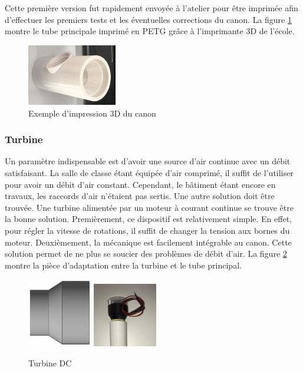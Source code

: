 Cette première version fut rapidement envoyée à l’atelier pour être imprimée afin d’effectuer 
les premiers tests et les éventuelles corrections du canon. La figure \ref{fig:3DPrintCanon} montre 
le tube principale imprimé en PETG grâce à l’imprimante 3D de l’école.

\begin{figure}[H]
    \centering
    \includegraphics[width=0.35\textwidth]{Images/photos_PGA/CanonBloc.jpg}
    \caption{Exemple d'impression 3D du canon}
    \label{fig:3DPrintCanon}
\end{figure}

\subsubsection{Turbine}

Un paramètre indispensable est d’avoir une source d’air continue avec un débit satisfaisant. La salle de classe étant 
équipée d’air comprimé, il suffit de l’utiliser pour avoir un débit d’air constant. Cependant, 
le bâtiment étant encore en travaux, les raccords d’air n’étaient pas sertis. Une autre solution doit 
être trouvée. Une turbine alimentée par un moteur à courant continue se trouve être la bonne 
solution. Premièrement, ce dispositif est relativement simple. En effet, pour régler la vitesse de rotations, il suffit 
de changer la tension aux bornes du moteur. Deuxièmement, la mécanique est facilement intégrable 
au canon. Cette solution permet de ne plus se soucier des problèmes de débit d’air. La figure \ref{fig:turbine}
montre la pièce d'adaptation entre la turbine et le tube principal.

\begin{figure}[H]
    \centering
    \includegraphics[width=0.25\textwidth]{Images/photos_PGA/adaptmotventi.PNG}
    \includegraphics[width=0.25\textwidth]{Images/photos_PGA/zoomTurbine.jpg}
    \caption{Turbine DC}
    \label{fig:turbine}
\end{figure}

